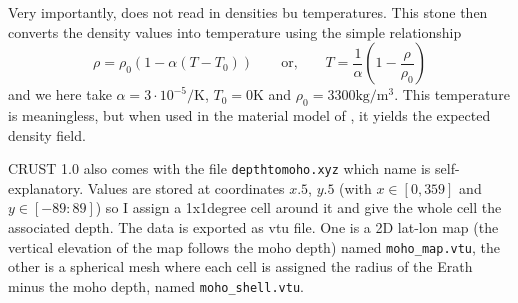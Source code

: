 Very importantly, \aspect{} does not read in densities bu temperatures. This stone then 
converts the density values into temperature using the simple relationship
\[
\rho = \rho_0 (1-\alpha(T-T_0))
\qquad \text{or,} \qquad
T= \frac{1}{\alpha} \left(1 - \frac{\rho}{\rho_0} \right)
\]
and we here take $\alpha = 3\cdot 10^{-5}\si{\per\kelvin}$, 
$T_0=0\si{\kelvin}$ and $\rho_0=3300\si{\kilo\gram\per\cubic\metre}$. 
This temperature is meaningless, but when used in the material model of \aspect{}, 
it yields the expected density field. 

CRUST 1.0 also comes with the file {\tt depthtomoho.xyz} which name is 
self-explanatory. Values are stored at coordinates $x.5$, $y.5$ (with $x\in[0,359]$
and $y\in [-89:89]$) so I assign a 1x1degree cell around it and give the whole cell 
the associated depth.
The data is exported as vtu file. One is a 2D lat-lon map (the vertical 
elevation of the map follows the moho depth) named {\tt moho\_map.vtu}, the other is a 
spherical mesh where each cell is assigned the radius of the Erath minus the moho depth, 
named {\tt moho\_shell.vtu}.

